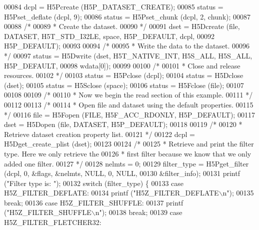 \begin{DoxyCode}
00084     dcpl = H5Pcreate (H5P\_DATASET\_CREATE);
00085     status = H5Pset\_deflate (dcpl, 9);
00086     status = H5Pset\_chunk (dcpl, 2, chunk);
00087 
00088     \textcolor{comment}{/*}
00089 \textcolor{comment}{     * Create the dataset.}
00090 \textcolor{comment}{     */}
00091     dset = H5Dcreate (file, DATASET, H5T\_STD\_I32LE, space, H5P\_DEFAULT, dcpl,
00092                 H5P\_DEFAULT);
00093 
00094     \textcolor{comment}{/*}
00095 \textcolor{comment}{     * Write the data to the dataset.}
00096 \textcolor{comment}{     */}
00097     status = H5Dwrite (dset, H5T\_NATIVE\_INT, H5S\_ALL, H5S\_ALL, H5P\_DEFAULT,
00098                 wdata[0]);
00099 
00100     \textcolor{comment}{/*}
00101 \textcolor{comment}{     * Close and release resources.}
00102 \textcolor{comment}{     */}
00103     status = H5Pclose (dcpl);
00104     status = H5Dclose (dset);
00105     status = H5Sclose (space);
00106     status = H5Fclose (file);
00107 
00108 
00109     \textcolor{comment}{/*}
00110 \textcolor{comment}{     * Now we begin the read section of this example.}
00111 \textcolor{comment}{     */}
00112 
00113     \textcolor{comment}{/*}
00114 \textcolor{comment}{     * Open file and dataset using the default properties.}
00115 \textcolor{comment}{     */}
00116     file = H5Fopen (FILE, H5F\_ACC\_RDONLY, H5P\_DEFAULT);
00117     dset = H5Dopen (file, DATASET, H5P\_DEFAULT);
00118 
00119     \textcolor{comment}{/*}
00120 \textcolor{comment}{     * Retrieve dataset creation property list.}
00121 \textcolor{comment}{     */}
00122     dcpl = H5Dget\_create\_plist (dset);
00123 
00124     \textcolor{comment}{/*}
00125 \textcolor{comment}{     * Retrieve and print the filter type.  Here we only retrieve the}
00126 \textcolor{comment}{     * first filter because we know that we only added one filter.}
00127 \textcolor{comment}{     */}
00128     nelmts = 0;
00129     filter\_type = H5Pget\_filter (dcpl, 0, &flags, &nelmts, NULL, 0, NULL,
00130                 &filter\_info);
00131     printf (\textcolor{stringliteral}{"Filter type is: "});
00132     \textcolor{keywordflow}{switch} (filter\_type) \{
00133         \textcolor{keywordflow}{case} H5Z\_FILTER\_DEFLATE:
00134             printf (\textcolor{stringliteral}{"H5Z\_FILTER\_DEFLATE\(\backslash\)n"});
00135             \textcolor{keywordflow}{break};
00136         \textcolor{keywordflow}{case} H5Z\_FILTER\_SHUFFLE:
00137             printf (\textcolor{stringliteral}{"H5Z\_FILTER\_SHUFFLE\(\backslash\)n"});
00138             \textcolor{keywordflow}{break};
00139         \textcolor{keywordflow}{case} H5Z\_FILTER\_FLETCHER32:

\end{DoxyCode}

